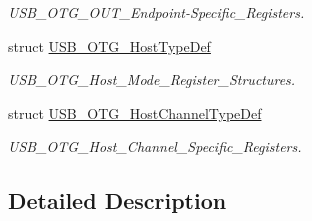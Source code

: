 \begin{DoxyCompactItemize}
\begin{DoxyCompactList}\small\item\em U\+S\+B\+\_\+\+O\+T\+G\+\_\+\+O\+U\+T\+\_\+\+Endpoint-\/\+Specific\+\_\+\+Registers. \end{DoxyCompactList}\item 
struct \mbox{\hyperlink{struct_u_s_b___o_t_g___host_type_def}{U\+S\+B\+\_\+\+O\+T\+G\+\_\+\+Host\+Type\+Def}}
\begin{DoxyCompactList}\small\item\em U\+S\+B\+\_\+\+O\+T\+G\+\_\+\+Host\+\_\+\+Mode\+\_\+\+Register\+\_\+\+Structures. \end{DoxyCompactList}\item 
struct \mbox{\hyperlink{struct_u_s_b___o_t_g___host_channel_type_def}{U\+S\+B\+\_\+\+O\+T\+G\+\_\+\+Host\+Channel\+Type\+Def}}
\begin{DoxyCompactList}\small\item\em U\+S\+B\+\_\+\+O\+T\+G\+\_\+\+Host\+\_\+\+Channel\+\_\+\+Specific\+\_\+\+Registers. \end{DoxyCompactList}\end{DoxyCompactItemize}


\subsection{Detailed Description}
